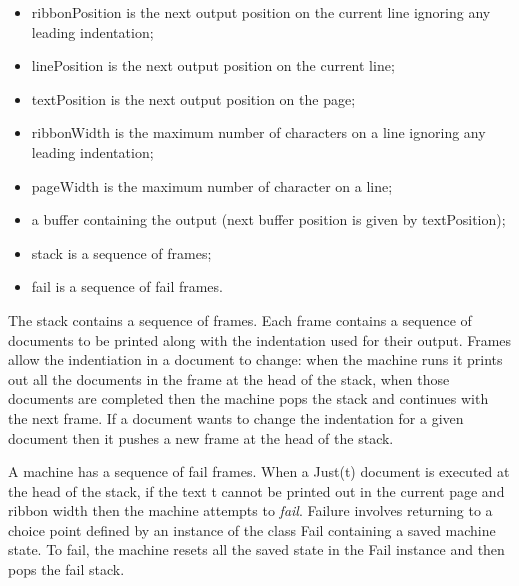 \begin{itemize}
\item ribbonPosition is the next output position on the current line ignoring
any leading indentation;
\item linePosition is the next output position on the current line;
\item textPosition is the next output position on the page;
\item ribbonWidth is the maximum number of characters on a line ignoring
any leading indentation;
\item pageWidth is the maximum number of character on a line;
\item a buffer containing the output (next buffer position is given by textPosition);
\item stack is a sequence of frames;
\item fail is a sequence of fail frames.
\end{itemize}
The stack contains a sequence of frames. Each frame contains a sequence
of documents to be printed along with the indentation used for their
output. Frames allow the indentiation in a document to change: when
the machine runs it prints out all the documents in the frame at the
head of the stack, when those documents are completed then the machine
pops the stack and continues with the next frame. If a document wants
to change the indentation for a given document then it pushes a new
frame at the head of the stack.

A machine has a sequence of fail frames. When a Just(t) document is
executed at the head of the stack, if the text t cannot be printed
out in the current page and ribbon width then the machine attempts
to \textit{fail}. Failure involves returning to a choice point defined
by an instance of the class Fail containing a saved machine state.
To fail, the machine resets all the saved state in the Fail instance
and then pops the fail stack.

